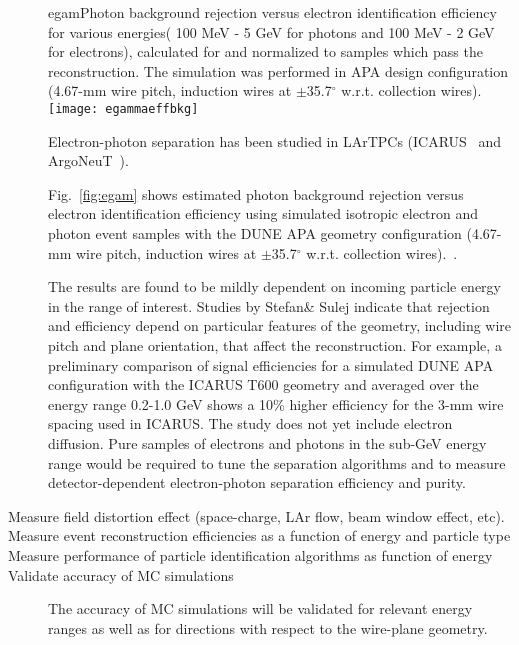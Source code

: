 \begin{description}
\begin{cdrfigure}{egam}{Photon background rejection versus electron identification efficiency for various energies( 100 MeV - 5 GeV for photons and 100 MeV - 2 GeV for electrons), calculated for and normalized to samples which pass the reconstruction.  The simulation was performed in APA design configuration (4.67-mm wire pitch, induction wires at $\pm$35.7$^{\circ}$ w.r.t. collection wires).}
\texttt{[image: egammaeffbkg]}
\end{cdrfigure}


Electron-photon separation has been studied in LArTPCs (ICARUS~\cite{icarus_eg} and ArgoNeuT~\cite{argoneut_eg}).

Fig.~\ref{fig:egam}  shows estimated photon background rejection versus electron identification efficiency using 
simulated isotropic electron and photon event samples  with the DUNE APA geometry configuration (4.67-mm wire pitch, induction wires at $\pm$35.7$^{\circ}$ w.r.t. collection wires).~\cite{dunecdr}. 

The results are found to be mildly dependent on incoming particle energy in the range of interest. 
%
Studies by Stefan\& Sulej indicate that rejection and efficiency depend 
on particular features of the geometry, including wire pitch and plane 
orientation, that affect the reconstruction. 
For example, a preliminary comparison of signal efficiencies for a simulated 
DUNE APA configuration with the ICARUS T600 geometry
and averaged over the energy range 0.2-1.0 GeV shows 
a 10\% higher efficiency for the 3-mm wire spacing used in ICARUS.
The study does not yet include electron diffusion.
%
Pure samples of electrons and photons in the sub-GeV energy range would be
required to tune the separation algorithms and to measure 
detector-dependent electron-photon separation efficiency and purity. 


\item [Measure field distortion effect (space-charge, LAr flow, beam window effect, etc).] 
\item [Measure event reconstruction efficiencies as a function of energy and particle type] 
\item [Measure performance of particle identification algorithms as function of energy]
\item [Validate accuracy of MC simulations] The accuracy of MC simulations will be validated for relevant energy ranges as well as for 
directions with respect to the wire-plane geometry.
\end{description}

